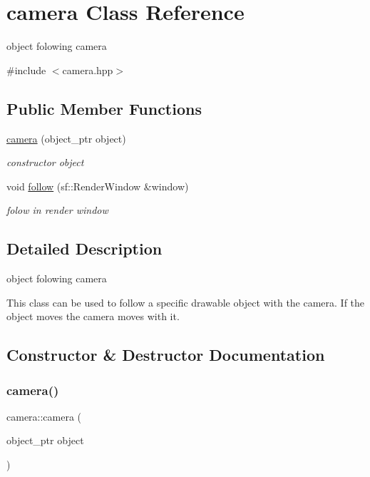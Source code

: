 \hypertarget{classcamera}{}\section{camera Class Reference}
\label{classcamera}


object folowing camera  




{\ttfamily \#include $<$camera.\+hpp$>$}

\subsection*{Public Member Functions}
\begin{DoxyCompactItemize}
\item 
\hyperlink{classcamera_ac3c67027b5f4f19c6f12db7d909930b5}{camera} (object\+\_\+ptr object)
\begin{DoxyCompactList}\small\item\em constructor object \end{DoxyCompactList}\item 
void \hyperlink{classcamera_a1bb99501ba67453e0ca86f3c8aef5cb1}{follow} (sf\+::\+Render\+Window \&window)
\begin{DoxyCompactList}\small\item\em folow in render window \end{DoxyCompactList}\end{DoxyCompactItemize}


\subsection{Detailed Description}
object folowing camera 

This class can be used to follow a specific drawable object with the camera. If the object moves the camera moves with it. 

\subsection{Constructor \& Destructor Documentation}
\mbox{\label{classcamera_ac3c67027b5f4f19c6f12db7d909930b5}} 
\subsubsection{\texorpdfstring{camera()}{camera()}}
{\footnotesize\ttfamily camera\+::camera (\begin{DoxyParamCaption}\item[{object\+\_\+ptr}]{object }\end{DoxyParamCaption})}



